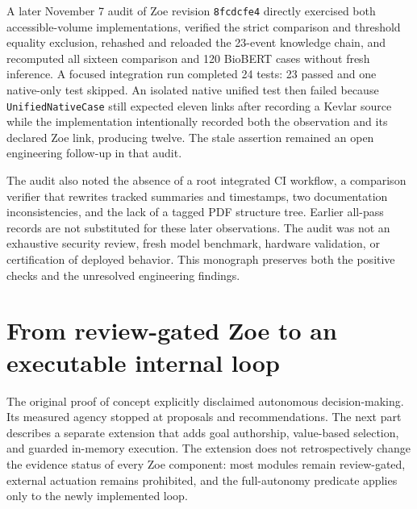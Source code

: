 A later November 7 audit of Zoe revision \texttt{8fcdcfe4} directly exercised both accessible-volume implementations, verified the strict comparison and threshold equality exclusion, rehashed and reloaded the 23-event knowledge chain, and recomputed all sixteen comparison and 120 BioBERT cases without fresh inference. A focused integration run completed 24 tests: 23 passed and one native-only test skipped. An isolated native unified test then failed because \texttt{UnifiedNativeCase} still expected eleven links after recording a Kevlar source while the implementation intentionally recorded both the observation and its declared Zoe link, producing twelve. The stale assertion remained an open engineering follow-up in that audit.

The audit also noted the absence of a root integrated CI workflow, a comparison verifier that rewrites tracked summaries and timestamps, two documentation inconsistencies, and the lack of a tagged PDF structure tree. Earlier all-pass records are not substituted for these later observations. The audit was not an exhaustive security review, fresh model benchmark, hardware validation, or certification of deployed behavior. This monograph preserves both the positive checks and the unresolved engineering findings.

\section{From review-gated Zoe to an executable internal loop}
The original proof of concept explicitly disclaimed autonomous decision-making. Its measured agency stopped at proposals and recommendations. The next part describes a separate extension that adds goal authorship, value-based selection, and guarded in-memory execution. The extension does not retrospectively change the evidence status of every Zoe component: most modules remain review-gated, external actuation remains prohibited, and the full-autonomy predicate applies only to the newly implemented loop.
